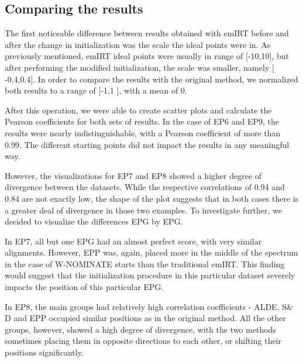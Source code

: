 \documentclass[a4paper,12pt]{report}
\begin{document}
            \subsection{Comparing the results}\label{subsec:comparing-the-results}
                The first noticeable difference between results obtained with emIRT before and after the change in
                initialization was the scale the ideal points were in.
                As previously mentioned, emIRT ideal points were usually
                in range of [-10,10], but after performing the modified initialization, the scale was smaller, namely [
                -0.4,0.4].
                In order to compare the results with the original method, we normalized both results to a range of [-1,1
                ], with
                a mean of 0.

                After this operation, we were able to create scatter plots and calculate the Pearson coefficients for
                both sets
                of results.
                In the case of EP6 and EP9, the results were nearly indistinguishable, with a Pearson coefficient of
                more than 0.99.
                The different starting points did not impact the results in any meaningful way.

                However, the visualizations for EP7 and EP8 showed a higher degree of divergence between the datasets.
                While the
                respective correlations of 0.94 and 0.84 are not exactly low, the shape of the plot suggests that in
                both cases
                there is a greater deal of divergence in those two examples. To investigate further, we decided to
                visualize the
                differences EPG by EPG.

                In EP7, all but one EPG had an almost perfect score, with very similar alignments. However, EPP was,
                again,
                placed more in the middle of the spectrum in the case of W-NOMINATE starts than the traditional emIRT.
                This
                finding would suggest that the initialization procedure in this particular dataset severely impacts the
                position of
                this particular EPG.

                In EP8, the main groups had relatively high correlation coefficients - ALDE, S\&
                D and EPP occupied similar
                positions as in the original method. All the other groups, however, showed a high degree of
                divergence, with the
                two methods sometimes placing them in opposite directions to each other, or shifting their
                positions significantly.
\end{document}

